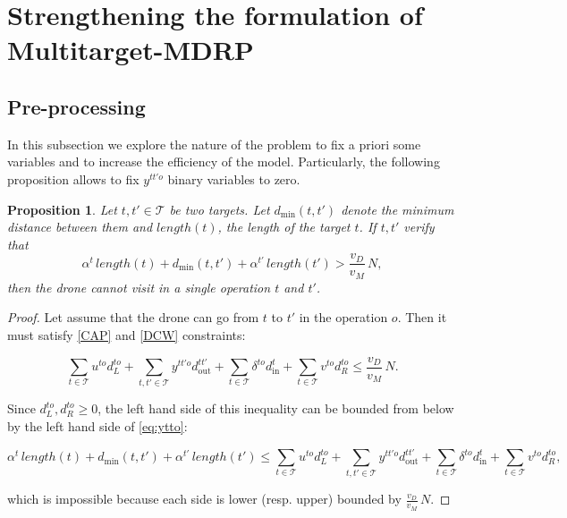\documentclass{itor}
\newtheorem{prop}{Proposition}
\theoremstyle{definition}
\theoremstyle{remark}
\def\AMD{{\sf Multitarget-MDRP\xspace}}
\begin{document}
\section{Strengthening the formulation of \AMD}\label{bounds}

\subsection{Pre-processing} \label{sec:preprocessing}
In this subsection we explore the nature of the problem to fix a priori some variables and to increase the efficiency of the model. Particularly, the following proposition allows to fix $y^{tt'o}$ binary variables to zero.

\begin{prop}\label{prop:preprocessing}
Let $t, t'\in\mathcal T$ be two targets. Let $d_{\text{min}}(t, t')$ denote the minimum distance between them and $length(t)$, the length of the target $t$. If $t, t'$ verify that
\begin{equation}\label{eq:ytto}
    \alpha^t\,length(t) + d_{\text{min}}(t, t')  + \alpha^{t'}\,length(t') > \frac{v_D}{v_M}\,N, 
\end{equation}
then the drone cannot visit in  a single operation $t$ and $t'$.
\end{prop}

\begin{proof}
Let assume that the drone can go from $t$ to $t'$ in the operation $o$. Then it must satisfy \eqref{CAP} and \eqref{DCW} constraints:

$$
\sum_{t\in \mathcal T} u^{to}d_L^{to} + \sum_{t, t'\in \mathcal T}y^{tt'o}d_{\text{out}}^{tt'} + \sum_{t\in\mathcal T} \delta^{to}d_{\text{in}}^{t} + \sum_{t\in \mathcal T} v^{to}d_R^{to} \leq \frac{v_D}{v_M}\,N.
$$

Since $d_L^{to}, d_R^{to}\geq 0$, the left hand side of this inequality can be  bounded from below by the left hand side of \eqref{eq:ytto}:

$$
\alpha^t\,length(t) + d_{\text{min}}(t, t')  + \alpha^{t'}\,length(t') \leq \sum_{t\in \mathcal T} u^{to}d_L^{to} + \sum_{t, t'\in \mathcal T}y^{tt'o}d_{\text{out}}^{tt'} + \sum_{t\in\mathcal T} \delta^{to}d_{\text{in}}^{t} + \sum_{t\in \mathcal T} v^{to}d_R^{to},
$$

which is impossible because each side is lower (resp. upper) bounded by $\frac{v_D}{v_M}\,N$. 

\end{proof}
\end{document}
